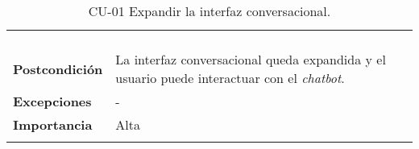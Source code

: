 \begin{longtable}[H]{@{}ll@{}}
\begin{minipage}[t]{0.71\columnwidth}
\begin{enumerate}
		\end{enumerate}\strut
	\end{minipage}\tabularnewline
	\begin{minipage}[t]{0.23\columnwidth}\raggedright\strut
		\textbf{Postcondición}\strut
	\end{minipage} & \begin{minipage}[t]{0.71\columnwidth}\raggedright\strut
		La interfaz conversacional queda expandida y el usuario puede interactuar con el \textit{chatbot}.\strut
	\end{minipage}\tabularnewline
	\begin{minipage}[t]{0.23\columnwidth}\raggedright\strut
		\textbf{Excepciones}\strut
	\end{minipage} & \begin{minipage}[t]{0.71\columnwidth}\raggedright\strut
		-\strut
	\end{minipage}\tabularnewline
	\begin{minipage}[t]{0.23\columnwidth}\raggedright\strut
		\textbf{Importancia}\strut
	\end{minipage} & \begin{minipage}[t]{0.71\columnwidth}\raggedright\strut
		Alta\strut
	\end{minipage}\tabularnewline
	\bottomrule
	\caption{CU-01 Expandir la interfaz conversacional.}
\end{longtable}

